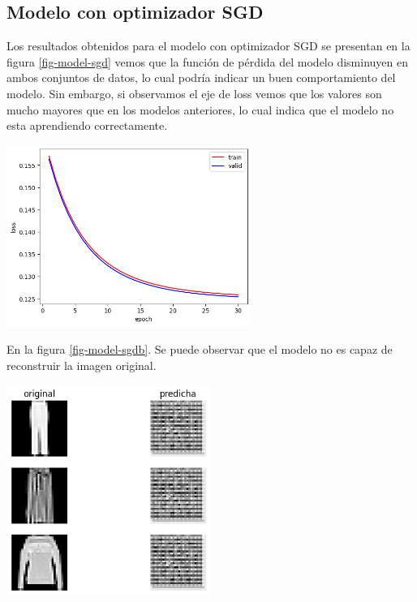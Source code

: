 \documentclass[aps,prl,reprint,groupedaddress]{revtex4-2}
\newenvironment{Figura}
  {\par\medskip\noindent\minipage{\linewidth}}
  {\endminipage\par\medskip}
\begin{document}
\subsection{Modelo con optimizador SGD}

Los resultados obtenidos para el modelo con optimizador SGD se presentan en la
figura \ref{fig-model-sgd} vemos que la función de pérdida del modelo 
disminuyen en ambos conjuntos de datos, lo cual podría indicar un buen 
comportamiento del modelo. Sin embargo, si observamos el eje de loss vemos que 
los valores son mucho mayores que en los modelos anteriores, lo cual indica que
el modelo no esta aprendiendo correctamente.
\begin{Figura}
  \centering
  \includegraphics[width=0.60\textwidth]{figs1/modelo_con_sdg.png}
  \label{fig-model-sgd}
\end{Figura}

En la figura \ref{fig-model-sgdb}. Se puede observar que el modelo no es capaz 
de reconstruir la imagen original.
\begin{Figura}
  \centering
  \includegraphics[width=0.5\textwidth]{figs1/test_modelo_sdg.png}
  \label{fig-model-sgdb}
\end{Figura}
\end{document}

